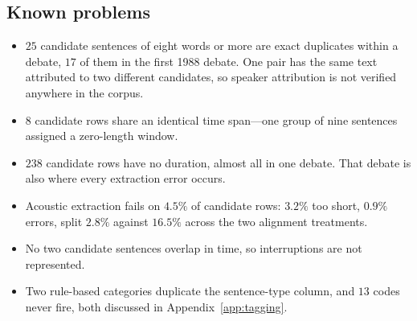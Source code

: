 \documentclass[pdflatex,sn-mathphys-num]{sn-jnl}%
\begin{document}
\begin{appendices}
\subsection*{Known problems}
\begin{itemize}\itemsep1pt
  \item $25$ candidate sentences of eight words or more are exact duplicates
        within a debate, $17$ of them in the first 1988 debate. One pair has
        the same text attributed to two different candidates, so speaker
        attribution is not verified anywhere in the corpus.
  \item $8$ candidate rows share an identical time span---one group of nine
        sentences assigned a zero-length window.
  \item $238$ candidate rows have no duration, almost all in one debate.
        That debate is also where every extraction error occurs.
  \item Acoustic extraction fails on $4.5\%$ of candidate rows: $3.2\%$ too
        short, $0.9\%$ errors, split $2.8\%$ against $16.5\%$ across the two
        alignment treatments.
  \item No two candidate sentences overlap in time, so interruptions are not
        represented.
  \item Two rule-based categories duplicate the sentence-type column, and
        $13$ codes never fire, both discussed in Appendix~\ref{app:tagging}.
\end{itemize}

\end{appendices}


\end{document}
